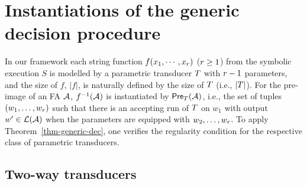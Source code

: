 
\section{Instantiations of the generic decision procedure}\label{sec-instan}

In our framework each string function $f(x_1, \cdots, x_r)$ ($r\geq 1$) from the symbolic execution $S$ is modelled by a parametric transducer $T$  
with $r-1$ parameters, and the size of $f$, $|f|$, is naturally defined by the size of $T$ (i.e., $|T|$). 
For the pre-image of an FA $\mathcal{A}$,  %
$f^{-1}(\mathcal{A})$ is instantiated by $\textsf{Pre}_{T}(\mathcal{A})$, i.e.,  the set of tuples $(w_1,\ldots, w_r)$ such that there is an accepting run of $T$ on $w_1$ with output $w'\in \mathcal{L}(\mathcal{A})$ when the parameters are equipped with $w_2,\ldots, w_r$. To apply Theorem~\ref{thm-generic-dec}, one verifies the regularity condition \prerec{} for the respective class of parametric transducers. %



 
\subsection{Two-way transducers}\label{sec-2way}



